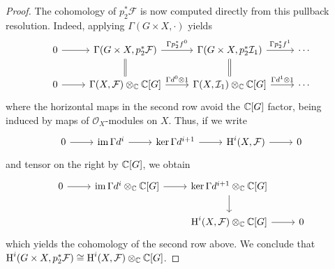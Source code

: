 \begin{proof}
    The cohomology of $p_2^*\mathcal{F}$ is now computed directly from this pullback resolution.
    Indeed, applying $\Gamma(G\times X,\cdot)$ yields
    \begin{equation*}
        \begin{tikzcd}
            0\ar{r} & \Gamma(G\times X, p_2^*\mathcal{F})\ar[equal]{d}\ar{r}{\Gamma p_2^*f^0} & \Gamma(G\times X, p_2^*\mathcal{I}_1)\ar{r}{\Gamma p_2^*f^1}\ar[equal]{d} & \cdots\\
            0\ar{r} & \Gamma(X, \mathcal{F})\otimes_\C\C[G]\ar{r}{\Gamma d^0\otimes 1} & \Gamma(X,\mathcal{I}_1)\otimes_\C\C[G]\ar{r}{\Gamma d^1\otimes 1} & \cdots
        \end{tikzcd}
    \end{equation*}
    where the horizontal maps in the second row avoid the $\mathbb{C}[G]$ factor, being induced by maps
    of $\mathcal{O}_X$-modules on $X$. Thus, if we write
    \begin{equation*}
        \begin{tikzcd}
            0\ar{r} & \im\Gamma d^i\ar{r} & \ker\Gamma d^{i+1}\ar{r} & \HH^i(X,\mathcal{F})\ar{r} & 0
        \end{tikzcd}
    \end{equation*}
    and tensor on the right by $\mathbb{C}[G]$, we obtain
    \begin{equation*}
        \begin{tikzcd}
            0\ar{r} & \im\Gamma d^i\otimes_\C\C[G]\ar{r} & \ker\Gamma d^{i+1}\otimes_\C\C[G]\ar{d}\\
            && \HH^i(X,\mathcal{F})\otimes_\C\C[G]\ar{r} & 0
        \end{tikzcd}
    \end{equation*}
    which yields the cohomology of the second row above. 
    We conclude that $\operatorname{H}^i(G\times X,p_2^*\mathcal{F})\cong \operatorname{H}^i(X,\mathcal{F})\otimes_{\mathbb{C}}\mathbb{C}[G]$.
\end{proof}


